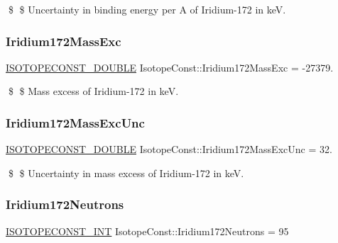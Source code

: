 \$ \$ Uncertainty in binding energy per A of Iridium-\/172 in keV. \mbox{\label{group___isotope_const-_iridium-_ir172_gaeb1f6b8cbcab789cde299bf8318c2e92}} 
\subsubsection{\texorpdfstring{Iridium172\+Mass\+Exc}{Iridium172MassExc}}
{\footnotesize\ttfamily \mbox{\hyperlink{group___isotope_const-_macros_ga8f45a7272ce02c0b4c65c44636ed719a}{I\+S\+O\+T\+O\+P\+E\+C\+O\+N\+S\+T\+\_\+\+D\+O\+U\+B\+LE}} Isotope\+Const\+::\+Iridium172\+Mass\+Exc = -\/27379.}

\$ \$ Mass excess of Iridium-\/172 in keV. \mbox{\label{group___isotope_const-_iridium-_ir172_ga754327bbf0bc989e62923692f2b55ae3}} 
\subsubsection{\texorpdfstring{Iridium172\+Mass\+Exc\+Unc}{Iridium172MassExcUnc}}
{\footnotesize\ttfamily \mbox{\hyperlink{group___isotope_const-_macros_ga8f45a7272ce02c0b4c65c44636ed719a}{I\+S\+O\+T\+O\+P\+E\+C\+O\+N\+S\+T\+\_\+\+D\+O\+U\+B\+LE}} Isotope\+Const\+::\+Iridium172\+Mass\+Exc\+Unc = 32.}

\$ \$ Uncertainty in mass excess of Iridium-\/172 in keV. \mbox{\label{group___isotope_const-_iridium-_ir172_ga34fa02e504ab820940f7282f9ef79555}} 
\subsubsection{\texorpdfstring{Iridium172\+Neutrons}{Iridium172Neutrons}}
{\footnotesize\ttfamily \mbox{\hyperlink{group___isotope_const-_macros_ga5f18360b3e99483a35c32d789e62621c}{I\+S\+O\+T\+O\+P\+E\+C\+O\+N\+S\+T\+\_\+\+I\+NT}} Isotope\+Const\+::\+Iridium172\+Neutrons = 95}


